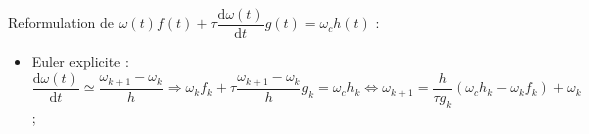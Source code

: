 \documentclass[10pt,fleqn]{article} %
\begin{document}
Reformulation de $\omega(t) f(t) + \tau \dfrac{\text{d} \omega(t)}{\text{d}t} g(t)  = \omega_c h(t)$ :
\begin{itemize}
\item Euler explicite : $\dfrac{\text{d} \omega(t)}{\text{d}t}\simeq \dfrac{\omega_{k+1}-\omega_k}{h} \Rightarrow  \omega_k f_k+ \tau  \dfrac{\omega_{k+1}-\omega_k}{h} g_k= \omega_c h_k  \Leftrightarrow \omega_{k+1} =\dfrac{h}{\tau g_k} \left(\omega_c h_k - \omega_k f_k \right)+\omega_k$;
\end{itemize}
%   
%
%
%
\end{document}
